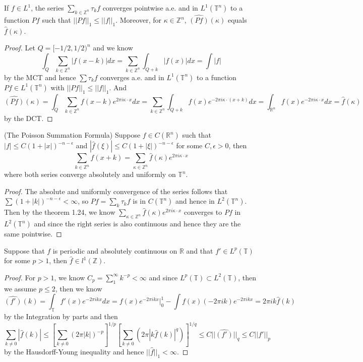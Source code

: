 \documentclass[lang=en, color=blue, ]{elegantbook}
\newcommand{\R}{\mathbb{R}}
\newcommand{\Z}{\mathbb{Z}}
\newcommand{\T}{\mathbb{T}}
\begin{document}
\begin{theorem}
    If $f\in L^1$, the series $\sum\limits_{k\in\Z^n}\tau_kf$ converges pointwise a.e. and in $L^1(\T^n)$ to a function $Pf$ such that $||Pf||_1 \leq ||f||_1$. Moreover, for $\kappa \in \Z^n$, $\hat{(Pf)}(\kappa)$ equals $\hat{f}(\kappa)$.
\end{theorem}
\begin{proof}\par
    Let $Q = [-1/2,1/2)^n$ and we know
    \[
    \int_Q \sum_{k\in\Z^n}|f(x-k)|dx = \sum\limits_{k\in\Z^n}\int_{Q+k}|f(x)| dx = \int |f|
    \]
    by the MCT and hence $\sum \tau_k f$ converges a.e. and in $L^1(\T^n)$ to a function $Pf \in L^1(\T^n)$ with $||Pf||_1 \leq ||f||_1$. And
    \[
    \hat{(Pf)}(\kappa) = \int_Q\sum\limits_{k\in \Z^n} f(x-k)e^{2\pi i \kappa\cdot x}dx = \sum\limits_{k\in\Z^n}\int_{Q+k}f(x)e^{-2\pi i \kappa \cdot(x+k)}dx = \int_{\R^n} f(x)e^{-2\pi i \kappa\cdot x} dx = \hat{f}(\kappa)
    \]
    by the DCT.
\end{proof}

\begin{theorem}
    (The Poisson Summation Formula) Suppose $f\in C(\R^n)$ such that $|f| \leq C(1+|x|)^{-n-\epsilon}$ and $|\hat{f}(\xi)| \leq C(1+|\xi|)^{-n-\epsilon}$ for some $C,\epsilon >0$, then
    \[
    \sum\limits_{k\in\Z^n} f(x+k) = \sum\limits_{\kappa\in\Z^n} \hat{f}(\kappa)e^{2\pi i \kappa\cdot x}
    \]
    where both series converge absolutely and uniformly on $\T^n$. 
\end{theorem}
\begin{proof}\par
    The absolute and uniformly convergence of the series follows that $\sum (1+|k|)^{-n-\epsilon} < \infty$, so $Pf = \sum_k \tau_k f$ is in $C(\T^n)$ and hence in $L^2(\T^n)$. Then by the theorem 1.24, we know $\sum_{\kappa\in\Z^n}\hat{f}(\kappa)e^{2\pi i \kappa\cdot x}$ converges to $Pf$ in $L^2(\T^n)$ and since the right series is also continuous and hence they are the same pointwise.
\end{proof}

\begin{theorem}
    Suppose that $f$ is periodic and absolutely continuous on $\R$ and that $f'\in L^p(\T)$ for some $p>1$, then $\hat{f}\in l^1(\Z)$.
\end{theorem}
\begin{proof}\par
    For $p>1$, we know $C_p = \sum_1^{\infty}k^{-p}<\infty$ and since $L^p(\T)\subset L^2(\T)$, then we assume $p\leq 2$, then we know
    \[
    \widehat{(f')}(k) = \int_{\T} f'(x)e^{-2\pi i kx}dx = f(x)e^{-2\pi i kx}|^1_0 - \int f(x)(-2\pi i k)e^{-2\pi i k x} = 2\pi i k \hat{f}(k)
    \]
    by the Integration by parts and then
    \[
    \sum_{k\neq 0}|\hat{f}(k)| \leq [\sum_{k\neq 0}(2\pi|k|)^{-p}]^{1/p}[\sum_{k\neq 0}(2\pi|k\hat{f}(k)|^q)]^{1/q} \leq C||\widehat{(f')}||_q \leq C||f'||_p
    \]
    by the Hausdorff-Young inequality and hence $||\hat{f}||_1 < \infty$.
\end{proof}
\end{document}
